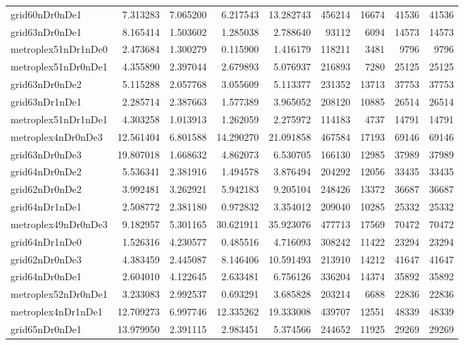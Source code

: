 \begin{longtable}{|l|r|r|r|r|r|r|r|r|}
grid60nDr0nDe1 & 7.313283 & 7.065200 & 6.217543 & 13.282743 & 456214 & 16674 & 41536 & 41536 \\
grid63nDr0nDe1 & 8.165414 & 1.503602 & 1.285038 & 2.788640 & 93112 & 6094 & 14573 & 14573 \\
metroplex51nDr1nDe0 & 2.473684 & 1.300279 & 0.115900 & 1.416179 & 118211 & 3481 & 9796 & 9796 \\
metroplex51nDr0nDe1 & 4.355890 & 2.397044 & 2.679893 & 5.076937 & 216893 & 7280 & 25125 & 25125 \\
grid63nDr0nDe2 & 5.115288 & 2.057768 & 3.055609 & 5.113377 & 231352 & 13713 & 37753 & 37753 \\
grid63nDr1nDe1 & 2.285714 & 2.387663 & 1.577389 & 3.965052 & 208120 & 10885 & 26514 & 26514 \\
metroplex51nDr1nDe1 & 4.303258 & 1.013913 & 1.262059 & 2.275972 & 114183 & 4737 & 14791 & 14791 \\
metroplex4nDr0nDe3 & 12.561404 & 6.801588 & 14.290270 & 21.091858 & 467584 & 17193 & 69146 & 69146 \\
grid63nDr0nDe3 & 19.807018 & 1.668632 & 4.862073 & 6.530705 & 166130 & 12985 & 37989 & 37989 \\
grid64nDr0nDe2 & 5.536341 & 2.381916 & 1.494578 & 3.876494 & 204292 & 12056 & 33435 & 33435 \\
grid62nDr0nDe2 & 3.992481 & 3.262921 & 5.942183 & 9.205104 & 248426 & 13372 & 36687 & 36687 \\
grid64nDr1nDe1 & 2.508772 & 2.381180 & 0.972832 & 3.354012 & 209040 & 10285 & 25332 & 25332 \\
metroplex49nDr0nDe3 & 9.182957 & 5.301165 & 30.621911 & 35.923076 & 477713 & 17569 & 70472 & 70472 \\
grid64nDr1nDe0 & 1.526316 & 4.230577 & 0.485516 & 4.716093 & 308242 & 11422 & 23294 & 23294 \\
grid62nDr0nDe3 & 4.383459 & 2.445087 & 8.146406 & 10.591493 & 213910 & 14212 & 41647 & 41647 \\
grid64nDr0nDe1 & 2.604010 & 4.122645 & 2.633481 & 6.756126 & 336204 & 14374 & 35892 & 35892 \\
metroplex52nDr0nDe1 & 3.233083 & 2.992537 & 0.693291 & 3.685828 & 203214 & 6688 & 22836 & 22836 \\
metroplex4nDr1nDe1 & 12.709273 & 6.997746 & 12.335262 & 19.333008 & 439707 & 12551 & 48339 & 48339 \\
grid65nDr0nDe1 & 13.979950 & 2.391115 & 2.983451 & 5.374566 & 244652 & 11925 & 29269 & 29269 \\

\end{longtable}
